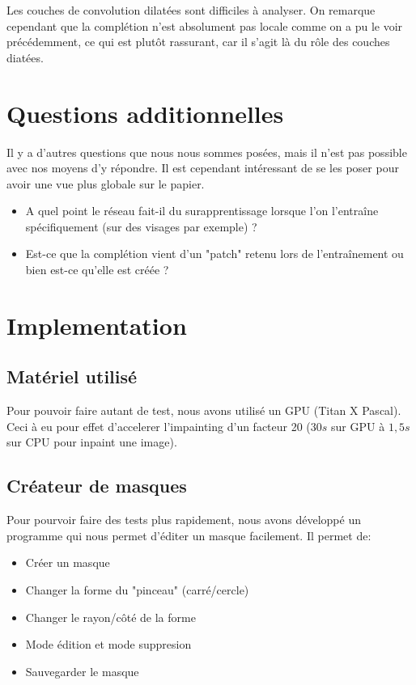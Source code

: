 \documentclass[12pt]{article}
\begin{document}
Les couches de convolution dilatées sont difficiles à analyser. On remarque cependant que la complétion n'est absolument pas locale comme on a pu le voir précédemment, ce qui est plutôt rassurant, car il s'agit là du rôle des couches diatées.

\section{Questions additionnelles}

Il y a d'autres questions que nous nous sommes posées, mais il n'est pas possible avec nos moyens d'y répondre. Il est cependant intéressant de se les poser pour avoir une vue plus globale sur le papier.
\begin{itemize}
    \item A quel point le réseau fait-il du surapprentissage lorsque l'on l'entraîne spécifiquement (sur des visages par exemple) ?
    \item Est-ce que la complétion vient d'un "patch" retenu lors de l'entraînement ou bien est-ce qu'elle est créée ?
\end{itemize}



\section{Implementation}

\subsection{Matériel utilisé}
Pour pouvoir faire autant de test, nous avons utilisé un GPU (Titan X
Pascal). Ceci à eu pour effet d'accelerer l'impainting d'un facteur 20
($30s$ sur GPU à $1,5s$ sur CPU pour inpaint une image).

\subsection{Créateur de masques}
Pour pourvoir faire des tests plus rapidement, nous avons développé
un programme qui nous permet d'éditer un masque facilement.
Il permet de:
\begin{itemize}
\item Créer un masque
\item Changer la forme du "pinceau" (carré/cercle)
\item Changer le rayon/côté de la forme
\item Mode édition et mode suppresion
\item Sauvegarder le masque
\end{itemize}
\end{document}
